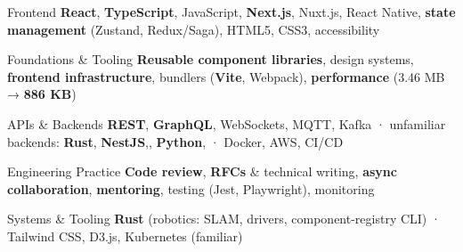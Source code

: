 
\begin{cvskills}

  \cvskill
  {Frontend}
  {\textbf{React}, \textbf{TypeScript}, JavaScript, \textbf{Next.js}, Nuxt.js, React Native, \textbf{state management} (Zustand, Redux/Saga), HTML5, CSS3, accessibility}

  \cvskill
  {Foundations \& Tooling}
  {\textbf{Reusable component libraries}, design systems, \textbf{frontend infrastructure}, bundlers (\textbf{Vite}, Webpack), \textbf{performance} (3.46 MB → \textbf{886 KB})}

  \cvskill
  {APIs \& Backends}
  {\textbf{REST}, \textbf{GraphQL}, WebSockets, MQTT, Kafka · unfamiliar backends: \textbf{Rust}, \textbf{NestJS},, \textbf{Python}, · Docker, AWS, CI/CD}

  \cvskill
  {Engineering Practice}
  {\textbf{Code review}, \textbf{RFCs} \& technical writing, \textbf{async collaboration}, \textbf{mentoring}, testing (Jest, Playwright), monitoring}

  \cvskill
  {Systems \& Tooling}
  {\textbf{Rust} (robotics: SLAM, drivers, component-registry CLI) · Tailwind CSS, D3.js, Kubernetes (familiar)}

\end{cvskills}
